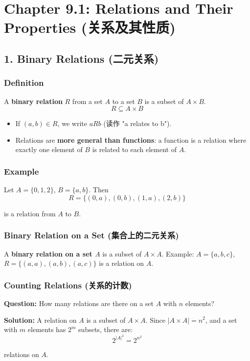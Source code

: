\documentclass[10pt,a4paper,openany]{ctexbook}
\theoremstyle{definition}
\theoremstyle{remark}
\renewenvironment{quote}
  {\list{}{\leftmargin=1em\rightmargin=0pt\topsep=0.5pt\partopsep=0pt}\item[]}
  {\endlist}
\begin{document}
\section{Chapter 9.1: Relations and Their Properties (关系及其性质)}

\vspace{-2pt}

\subsection{1. Binary Relations (二元关系)}

\subsubsection{Definition}

A \textbf{binary relation} $R$ from a set $A$ to a set $B$ is a subset of $A \times B$.
\[
R \subseteq A \times B
\]

\begin{itemize}
\item If $(a, b) \in R$, we write $a R b$ (读作 "a relates to b").
\item Relations are \textbf{more general than functions}: a function is a relation where exactly one element of $B$ is related to each element of $A$.

\end{itemize}

\subsubsection{Example}

Let $A = \{0, 1, 2\}$, $B = \{a, b\}$. Then
\[
R = \{(0, a), (0, b), (1, a), (2, b)\}
\]

is a relation from $A$ to $B$.
\subsubsection{Binary Relation on a Set (集合上的二元关系)}

A \textbf{binary relation on a set $A$} is a subset of $A \times A$.
Example: $A = \{a, b, c\}$, $R = \{(a, a), (a, b), (a, c)\}$ is a relation on $A$.
\subsubsection{Counting Relations (关系的计数)}

\begin{quote}
\textbf{Question:} How many relations are there on a set $A$ with $n$ elements?

\textbf{Solution:} A relation on $A$ is a subset of $A \times A$. Since $|A \times A| = n^2$, and a set with $m$ elements has $2^m$ subsets, there are:
\[
2^{|A|^2} = 2^{n^2}
\]

relations on $A$.

\end{quote}
\vspace{-2pt}
\end{document}
